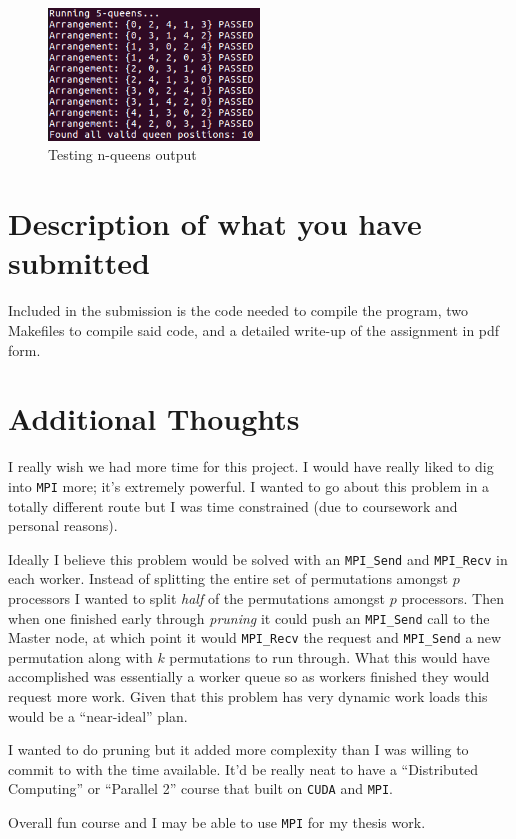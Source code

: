 \documentclass{article}
\begin{document}
\begin{figure}[h]
    \centering
    \includegraphics[width=0.5\textwidth]{images/console_output}
    \caption{Testing n-queens output}
    \label{fig:console}
\end{figure}

\section{Description of what you have submitted}
Included in the submission is the code needed to compile the program, two 
Makefiles to compile said code, and a detailed write-up of the assignment in pdf 
form.

\section{Additional Thoughts}
I really wish we had more time for this project. I would have really liked to 
dig into \verb|MPI| more; it's extremely powerful. I wanted to go about this 
problem in a totally different route but I was time constrained (due to 
coursework and personal reasons). 

Ideally I believe this problem would be solved with an \verb|MPI_Send| and 
\verb|MPI_Recv| in each worker. Instead of splitting the entire set of 
permutations amongst $p$ processors I wanted to split \textit{half} of the 
permutations amongst $p$ processors. Then when one finished early through 
\textit{pruning} it could push an \verb|MPI_Send| call to the Master node, at 
which point it would \verb|MPI_Recv| the request and \verb|MPI_Send| a new 
permutation along with $k$ permutations to run through. What this would have 
accomplished was essentially a worker queue so as workers finished they would 
request more work. Given that this problem has very dynamic work loads this 
would be a ``near-ideal'' plan.

I wanted to do pruning but it added more complexity than I was willing to commit 
to with the time available. It'd be really neat to have a 
``Distributed Computing'' or ``Parallel 2'' course that built on \verb|CUDA| and 
\verb|MPI|.

Overall fun course and I may be able to use \verb|MPI| for my thesis work.
\end{document}
